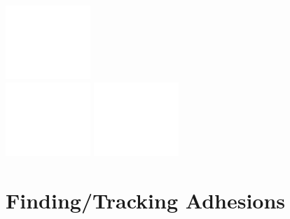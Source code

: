 \documentclass{beamer}
\begin{document}
\begin{frame}
\begin{center}
	\includegraphics[width=0.24\textwidth]{figures/finding/movie_backup/08}
	\\
	\includegraphics[width=0.24\textwidth]{figures/finding/movie_backup/09}
	\includegraphics[width=0.24\textwidth]{figures/finding/movie_backup/10}
	\end{center}
\end{frame}


\section[Finding/Tracking]{Finding/Tracking Adhesions}
\end{document}
